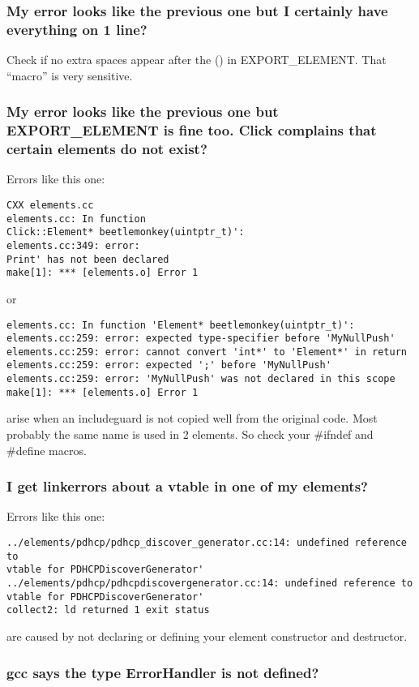 \documentclass[a4paper]{article}
\begin{document}
\subsubsection*{My error looks like the previous one but I certainly have everything on
1 line?}

Check if no extra spaces appear after the () in EXPORT\_ELEMENT. That
``macro'' is very sensitive.

\subsubsection*{My error looks like the previous one but EXPORT\_ELEMENT is fine too.
Click complains that certain elements do not exist?}

Errors like this one:
\begin{lstlisting}
CXX elements.cc
elements.cc: In function
Click::Element* beetlemonkey(uintptr_t)':
elements.cc:349: error:
Print' has not been declared
make[1]: *** [elements.o] Error 1
\end{lstlisting}
or
\begin{lstlisting}
elements.cc: In function 'Element* beetlemonkey(uintptr_t)':
elements.cc:259: error: expected type-specifier before 'MyNullPush'
elements.cc:259: error: cannot convert 'int*' to 'Element*' in return
elements.cc:259: error: expected ';' before 'MyNullPush'
elements.cc:259: error: 'MyNullPush' was not declared in this scope
make[1]: *** [elements.o] Error 1
\end{lstlisting}

arise when an includeguard is not copied well from the original code.
Most probably the same name is used in 2 elements. So check your
\#ifndef and \#define macros.

\subsubsection*{I get linkerrors about a vtable in one of my elements?}

Errors like this one:
\begin{lstlisting}
../elements/pdhcp/pdhcp_discover_generator.cc:14: undefined reference to
vtable for PDHCPDiscoverGenerator'
../elements/pdhcp/pdhcpdiscovergenerator.cc:14: undefined reference to
vtable for PDHCPDiscoverGenerator'
collect2: ld returned 1 exit status
\end{lstlisting}
are caused by not declaring or defining your element constructor and
destructor.

\subsubsection*{gcc says the type ErrorHandler is not defined?}
\end{document}
